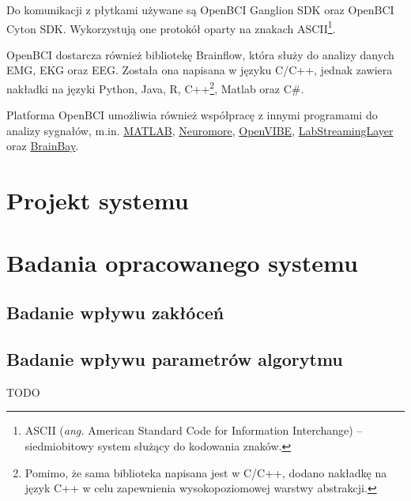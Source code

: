 \documentclass[skorowidz,skroty]{dyplomWEZUT}
\begin{document}
Do komunikacji z płytkami używane są OpenBCI Ganglion SDK oraz OpenBCI Cyton SDK. Wykorzystują one protokół oparty na znakach ASCII\footnote{ASCII (\textit{ang.} American Standard Code for Information Interchange) -- siedmiobitowy system służący do kodowania znaków.}.

OpenBCI dostarcza również bibliotekę Brainflow, która służy do analizy danych EMG, EKG oraz EEG\cite{markiv_software_brainflow}. Została ona napisana w języku C/C++, jednak zawiera nakładki na języki Python, Java, R, C++\footnote{Pomimo, że sama biblioteka napisana jest w C/C++, dodano nakładkę na język C++ w celu zapewnienia wysokopoziomowej warstwy abstrakcji.}, Matlab oraz C\#.

Platforma OpenBCI umożliwia również współpracę z innymi programami do analizy sygnałów, m.in. \href{https://www.mathworks.com/products/matlab.html}{MATLAB}, \href{https://www.neuromore.com/}{Neuromore}, \href{http://openvibe.inria.fr/}{OpenVIBE}, \href{https://github.com/sccn/labstreaminglayer}{LabStreamingLayer} oraz \href{http://www.shifz.org/brainbay/}{BrainBay}.


\chapter{Projekt systemu}

\chapter{Badania opracowanego systemu}
\section{Badanie wpływu zakłóceń}
\section{Badanie wpływu parametrów algorytmu}



\begin{zakonczenie}\label{chap:zakonczenie}
TODO
\end{zakonczenie}

\printbibliography[heading=bibintoc]

\listoftables

\listoffigures

\listoflistings


\printindex
\end{document}
